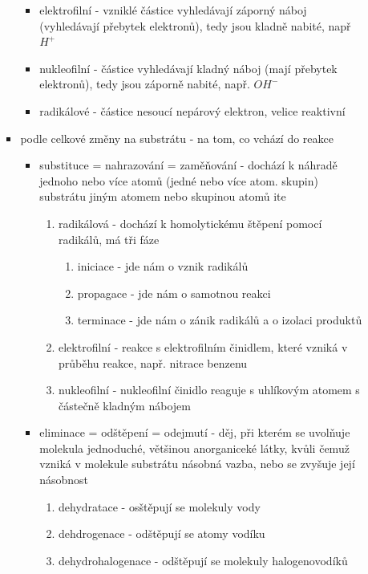 \documentclass{article}
\begin{document}
\begin{itemize}
\begin{itemize}
\begin{itemize}
\begin{itemize}
        \item elektrofilní - vzniklé částice vyhledávají záporný náboj (vyhledávají přebytek elektronů), tedy jsou kladně nabité, např $H^+$
        \item nukleofilní - částice vyhledávají kladný náboj (mají přebytek elektronů), tedy jsou záporně nabité, např. $OH^-$
        \item radikálové - částice nesoucí nepárový elektron, velice reaktivní
      \end{itemize}
      \item podle celkové změny na substrátu - na tom, co vchází do reakce
      \begin{itemize}
        \item substituce = nahrazování = zaměňování - dochází k náhradě jednoho nebo více atomů (jedné nebo více atom. skupin) substrátu jiným atomem nebo skupinou atomů
        ite
        \begin{enumerate}
          \item radikálová - dochází k homolytickému štěpení pomocí radikálů, má tři fáze
            \begin{enumerate}
              \item iniciace - jde nám o vznik radikálů
              \item propagace - jde nám o samotnou reakci
              \item terminace - jde nám o zánik radikálů a o izolaci produktů
            \end{enumerate}
            \item elektrofilní - reakce s elektrofilním činidlem, které vzniká v průběhu reakce, např. nitrace benzenu
            \item nukleofilní - nukleofilní činidlo reaguje s uhlíkovým atomem s částečně kladným nábojem
        \end{enumerate}
        \item eliminace = odštěpení = odejmutí - děj, při kterém se uvolňuje molekula jednoduché, většinou anorganiceké látky, kvůli čemuž vzniká v molekule substrátu násobná vazba, nebo se zvyšuje její násobnost
        \begin{enumerate}
          \item dehydratace - osštěpují se molekuly vody
          \item dehdrogenace - odštěpují se atomy vodíku
          \item dehydrohalogenace - odštěpují se molekuly halogenovodíků
        \end{enumerate}

\end{itemize}
\end{itemize}
\end{itemize}
\end{itemize}
\end{document}

